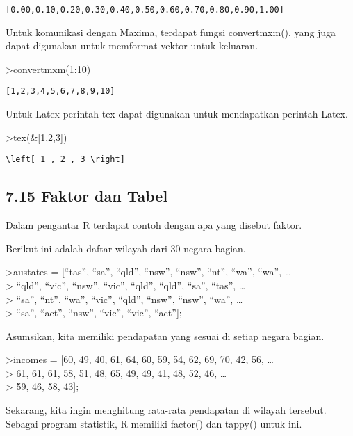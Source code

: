 \documentclass[
]{book}
\begin{document}
\begin{verbatim}
[0.00,0.10,0.20,0.30,0.40,0.50,0.60,0.70,0.80,0.90,1.00]
\end{verbatim}

Untuk komunikasi dengan Maxima, terdapat fungsi convertmxm(), yang juga dapat digunakan untuk memformat vektor untuk keluaran.

\textgreater convertmxm(1:10)

\begin{verbatim}
[1,2,3,4,5,6,7,8,9,10]
\end{verbatim}

Untuk Latex perintah tex dapat digunakan untuk mendapatkan perintah Latex.

\textgreater tex(\&{[}1,2,3{]})

\begin{verbatim}
\left[ 1 , 2 , 3 \right] 
\end{verbatim}

\subsection{7.15 Faktor dan Tabel}\label{faktor-dan-tabel}

Dalam pengantar R terdapat contoh dengan apa yang disebut faktor.

Berikut ini adalah daftar wilayah dari 30 negara bagian.

\textgreater austates = {[}``tas'', ``sa'', ``qld'', ``nsw'', ``nsw'', ``nt'', ``wa'', ``wa'', \ldots{}\\
\textgreater{} ``qld'', ``vic'', ``nsw'', ``vic'', ``qld'', ``qld'', ``sa'', ``tas'', \ldots{}\\
\textgreater{} ``sa'', ``nt'', ``wa'', ``vic'', ``qld'', ``nsw'', ``nsw'', ``wa'', \ldots{}\\
\textgreater{} ``sa'', ``act'', ``nsw'', ``vic'', ``vic'', ``act''{]};

Asumsikan, kita memiliki pendapatan yang sesuai di setiap negara bagian.

\textgreater incomes = {[}60, 49, 40, 61, 64, 60, 59, 54, 62, 69, 70, 42, 56, \ldots{}\\
\textgreater{} 61, 61, 61, 58, 51, 48, 65, 49, 49, 41, 48, 52, 46, \ldots{}\\
\textgreater{} 59, 46, 58, 43{]};

Sekarang, kita ingin menghitung rata-rata pendapatan di wilayah tersebut. Sebagai program statistik, R memiliki factor() dan tappy() untuk ini.
\end{document}
